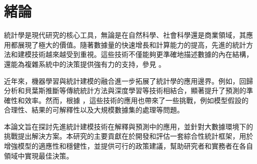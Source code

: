 \chapter{緒論}
\label{c:intro}

統計學是現代研究的核心工具，無論是在自然科學、社會科學還是商業領域，其應用都展現了極大的價值。隨著數據量的快速增長和計算能力的提高，先進的統計方法和建模技術越來越受到重視。這些技術不僅能夠更準確地描述數據的內在結構，還能為複雜系統中的決策提供強有力的支持，參見 \cite{Alpher02}。

近年來，機器學習與統計建模的融合進一步拓展了統計學的應用邊界。例如，回歸分析和貝葉斯推斷等傳統統計方法與深度學習等技術相結合，顯著提升了預測的準確性和效率。然而，根據 \cite{Alpher03}，這些技術的應用也帶來了一些挑戰，例如模型假設的合理性、結果的可解釋性以及大規模數據集的處理等問題。

本論文旨在探討先進統計建模技術在解釋與預測中的應用，並針對大數據環境下的挑戰提出解決方案。本研究的主要貢獻在於開發和評估一套綜合性統計框架，用於增強模型的適應性和穩健性，並提供可行的政策建議，幫助研究者和實務者在各自領域中實現最佳決策。
